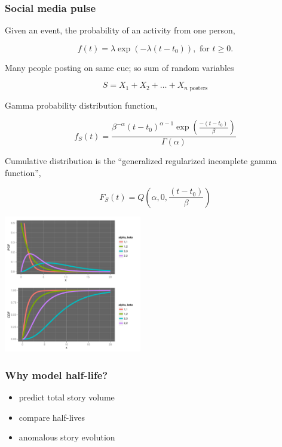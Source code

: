 \documentclass{beamer}
\begin{document}
\begin{frame}
\frametitle{Social media pulse} 
Given an event, the probability of an activity from one person,

\begin{equation*}
f(t) = \lambda \exp(-\lambda (t-t_0)), \text{ for } t \geq 0.
\end{equation*}

Many people posting on same cue; so sum of random variables 

\begin{equation*}
S = X_1 + X_2 + \ldots + X_{n \text{ posters}}
\end{equation*}

Gamma probability distribution function,

\begin{equation*}
f_S(t) = \frac{ \beta^{-\alpha} (t-t_0)^{\alpha-1} \exp( \frac{-(t-t_0)}{\beta}) } {\Gamma(\alpha)}
\end{equation*}

Cumulative distribution is the ``generalized regularized incomplete gamma function'',

\begin{equation*}
F_S(t) = Q(\alpha, 0, \frac{ (t-t_0)}{\beta})
\end{equation*}
\end{frame}


\begin{frame}
  \begin{center}
   \includegraphics[height=6cm]{./imgs/SMP_gammadist.pdf}
  \end{center}
\end{frame}

\begin{frame}\frametitle{Why model half-life?}
{\Large
\begin{itemize}
\item predict total story volume
\item compare half-lives
\item anomalous story evolution
\end{itemize}
}
\end{frame}
\end{document}

